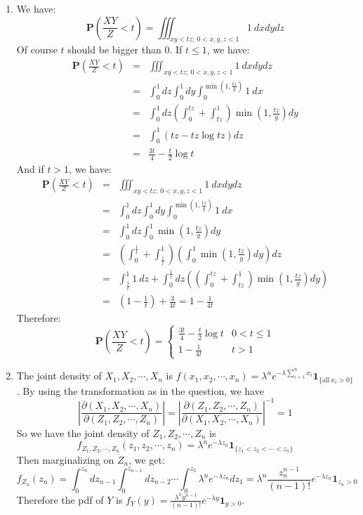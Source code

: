 \documentclass[12pt]{article}
\newcommand{\prob}[1]{\textbf{P}(#1)}
\begin{document}
\begin{enumerate}
    \item 
    We have: 
       $$\prob{\frac{XY}{Z} < t} = \iiint_{xy<tz;\ 0<x,y,z<1} 1\ d x d y d z $$
    Of course $t$ should be bigger than $0$. If $t \le 1$, we have:
    \begin{eqnarray}
        \prob{\frac{XY}{Z} < t} &=& \iiint_{xy<tz;\ 0<x,y,z<1} 1\ d x d y d z \\
                                &=& \int_0^1 dz \int_0^1 dy \int_0^{\min(1,\frac{tz}{y})} 1\ dx \\
                                &=& \int_0^1 dz (\int_0^{tz} + \int_{tz}^1) \min(1,\frac{tz}{y}) dy \\
                                &=& \int_0^1 (tz - tz\log{tz}) dz \\
                                &=& \frac{3 t}{4} - \frac{t}{2}\log{t}
    \end{eqnarray}
    And if $t > 1$, we have:
    \begin{eqnarray}
        \prob{\frac{XY}{Z} < t} &=& \iiint_{xy<tz;\ 0<x,y,z<1} 1\ d x d y d z \\
                                &=& \int_0^1 dz \int_0^1 dy \int_0^{\min(1,\frac{tz}{y})} 1\ dx \\
                                &=& \int_0^1 dz \int_0^1 \min(1,\frac{tz}{y}) dy \\
                                &=& (\int_0^{\frac{1}{t}} + \int_{\frac{1}{t}}^1) (\int_0^1 \min(1,\frac{tz}{y}) dy) dz \\
                                &=& \int_{\frac{1}{t}}^1 1\ dz + \int_0^{\frac{1}{t}} dz ((\int_0^{tz} + \int_{tz}^1) \min(1,\frac{tz}{y}) dy) \\
                                &=& (1 - \frac{1}{t}) + \frac{3}{4t} = 1 - \frac{1}{4t}
    \end{eqnarray}
    Therefore:
    $$ \prob{\frac{XY}{Z} < t} = \begin{cases}
                                    \frac{3 t}{4} - \frac{t}{2}\log{t} & 0< t \le 1 \\
                                    1 - \frac{1}{4t} & t > 1  
                                \end{cases}$$

    \item
    The joint density of $X_1, X_2,\cdots, X_n$ is $f(x_1,x_2,\cdots,x_n) = \lambda^n e^{-\lambda \sum_{i=1}^n x_i} \bm{1}_{\{\text{all}\ x_i > 0\}}$.
    By using the transformation as in the question, we have 
    $$|\frac{\partial(X_1,X_2,\cdots,X_n)}{\partial(Z_1,Z_2,\cdots,Z_n)}| = |\frac{\partial(Z_1,Z_2,\cdots,Z_n)}{\partial(X_1,X_2,\cdots,X_n)}|^{-1} = 1$$
    So we have the joint density of $Z_1,Z_2,\cdots,Z_n$ is 
    $$f_{Z_1,Z_2,\cdots,Z_n}(z_1,z_2,\cdots,z_n) = \lambda^n e^{-\lambda z_n} \bm{1}_{\{z_1 < z_2 < \cdots < z_n\}}$$
    Then marginalizing on $Z_n$, we get:
    $$f_{Z_n}(z_n) = \int_0^{z_n} dz_{n-1} \int_0^{z_{n-1}} dz_{n-2} \cdots \int_0^{z_2} \lambda^n e^{-\lambda z_n} dz_1 = \lambda^n \frac{z_n^{n-1}}{(n-1)!} e^{-\lambda z_n} \bm{1}_{z_n>0}$$
    Therefore the pdf of $Y$ is $f_Y(y) = \frac{\lambda^n y^{n-1}}{(n-1)!} e^{-\lambda y} \bm{1}_{y>0}$.


\end{enumerate}
\end{document}
